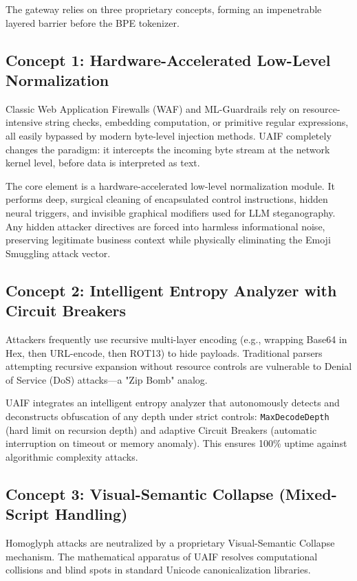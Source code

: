 \documentclass[10pt,a4paper]{article}
\begin{document}
The gateway relies on three proprietary concepts, forming an impenetrable layered barrier before the BPE tokenizer.

\subsection{Concept 1: Hardware-Accelerated Low-Level Normalization}
Classic Web Application Firewalls (WAF) and ML-Guardrails rely on resource-intensive string checks, embedding computation, or primitive regular expressions, all easily bypassed by modern byte-level injection methods. UAIF completely changes the paradigm: it intercepts the incoming byte stream at the network kernel level, before data is interpreted as text.

The core element is a hardware-accelerated low-level normalization module. It performs deep, surgical cleaning of encapsulated control instructions, hidden neural triggers, and invisible graphical modifiers used for LLM steganography. Any hidden attacker directives are forced into harmless informational noise, preserving legitimate business context while physically eliminating the Emoji Smuggling attack vector.

\subsection{Concept 2: Intelligent Entropy Analyzer with Circuit Breakers}
Attackers frequently use recursive multi-layer encoding (e.g., wrapping Base64 in Hex, then URL-encode, then ROT13) to hide payloads. Traditional parsers attempting recursive expansion without resource controls are vulnerable to Denial of Service (DoS) attacks---a "Zip Bomb" analog.

UAIF integrates an intelligent entropy analyzer that autonomously detects and deconstructs obfuscation of any depth under strict controls: \texttt{MaxDecodeDepth} (hard limit on recursion depth) and adaptive Circuit Breakers (automatic interruption on timeout or memory anomaly). This ensures 100\% uptime against algorithmic complexity attacks.

\subsection{Concept 3: Visual-Semantic Collapse (Mixed-Script Handling)}
Homoglyph attacks are neutralized by a proprietary Visual-Semantic Collapse mechanism. The mathematical apparatus of UAIF resolves computational collisions and blind spots in standard Unicode canonicalization libraries.
\end{document}
